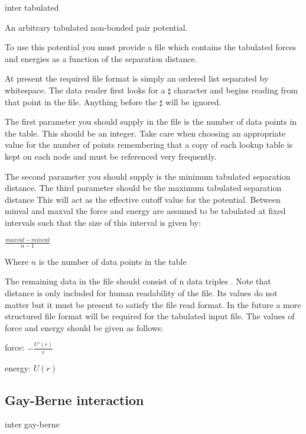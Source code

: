 \begin{essyntax}[TABULATED]
  inter   tabulated %
\end{essyntax}

An arbitrary tabulated non-bonded pair potential.

To use this potential you must provide a file which contains the
tabulated forces and energies as a function of the separation
distance.

At present the required file format is simply an ordered list
separated by whitespace. The data reader first looks for a $\sharp$
character and begins reading from that point in the file. Anything
before the $\sharp$ will be ignored.

The first parameter you should supply in the file is the number of
data points in the table. This should be an integer. Take care when
choosing an appropriate value for the number of points remembering
that a copy of each lookup table is kept on each node and must be
referenced very frequently.

The second parameter you should supply is the minimum tabulated
separation distance. The third parameter should be the maximum
tabulated separation distance This will act as the effective cutoff
value for the potential. Between minval and maxval the force and
energy are assumed to be tabulated at fixed intervals such that the
size of this interval is given by:

$\frac{maxval-minval}{n-1}$

Where $n$ is the number of data points in the table

The remaining data in the file should consist of n data triples
  . Note that distance is only
included for human readability of the file. Its values do not matter
but it must be present to satisfy the file read format. In the future
a more structured file format will be required for the tabulated input
file. The values of force and energy should be given as follows:

force: $-\frac{U'(r)}{r}$

energy: $U(r)$

\subsection{Gay-Berne interaction}

\begin{essyntax}
  inter   gay-berne
     
     
\end{essyntax}

